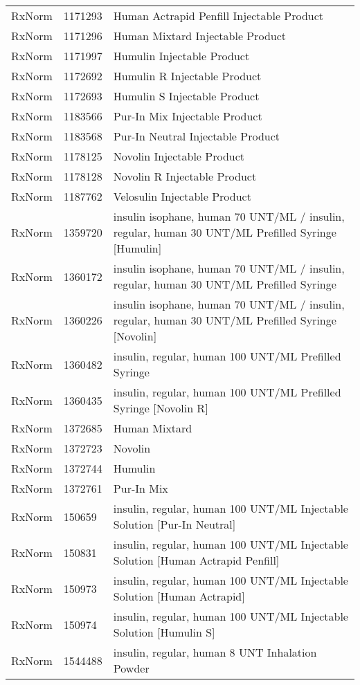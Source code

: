 \begin{longtable}{p{}p{}p{}}
  RxNorm & 1171293 & Human Actrapid Penfill Injectable Product \\ 
  RxNorm & 1171296 & Human Mixtard Injectable Product \\ 
  RxNorm & 1171997 & Humulin Injectable Product \\ 
  RxNorm & 1172692 & Humulin R Injectable Product \\ 
  RxNorm & 1172693 & Humulin S Injectable Product \\ 
  RxNorm & 1183566 & Pur-In Mix Injectable Product \\ 
  RxNorm & 1183568 & Pur-In Neutral Injectable Product \\ 
  RxNorm & 1178125 & Novolin Injectable Product \\ 
  RxNorm & 1178128 & Novolin R Injectable Product \\ 
  RxNorm & 1187762 & Velosulin Injectable Product \\ 
  RxNorm & 1359720 & insulin isophane, human 70 UNT/ML / insulin, regular, human 30 UNT/ML Prefilled Syringe [Humulin] \\ 
  RxNorm & 1360172 & insulin isophane, human 70 UNT/ML / insulin, regular, human 30 UNT/ML Prefilled Syringe \\ 
  RxNorm & 1360226 & insulin isophane, human 70 UNT/ML / insulin, regular, human 30 UNT/ML Prefilled Syringe [Novolin] \\ 
  RxNorm & 1360482 & insulin, regular, human 100 UNT/ML Prefilled Syringe \\ 
  RxNorm & 1360435 & insulin, regular, human 100 UNT/ML Prefilled Syringe [Novolin R] \\ 
  RxNorm & 1372685 & Human Mixtard \\ 
  RxNorm & 1372723 & Novolin \\ 
  RxNorm & 1372744 & Humulin \\ 
  RxNorm & 1372761 & Pur-In Mix \\ 
  RxNorm & 150659 & insulin, regular, human 100 UNT/ML Injectable Solution [Pur-In Neutral] \\ 
  RxNorm & 150831 & insulin, regular, human 100 UNT/ML Injectable Solution [Human Actrapid Penfill] \\ 
  RxNorm & 150973 & insulin, regular, human 100 UNT/ML Injectable Solution [Human Actrapid] \\ 
  RxNorm & 150974 & insulin, regular, human 100 UNT/ML Injectable Solution [Humulin S] \\ 
  RxNorm & 1544488 & insulin, regular, human 8 UNT Inhalation Powder \\ 

\end{longtable}

